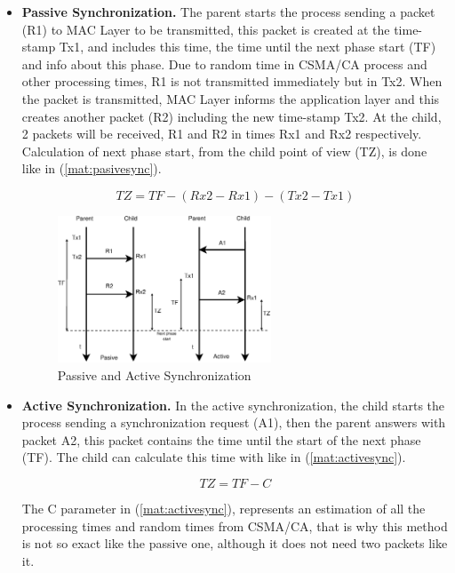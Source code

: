 \begin{itemize}
 \item \textbf{Passive Synchronization.} The parent starts the process sending a packet (R1) to \ac{MAC} Layer to be transmitted, this packet is
created at the time-stamp Tx1, and includes this time, the time until the next phase start (TF) and info about this phase. Due to random time in 
\ac{CSMA/CA} process and other processing times, R1 is not transmitted immediately but in Tx2. When the packet is transmitted, \ac{MAC} Layer informs
the application layer and this creates another packet (R2) including the new time-stamp Tx2. At the child, 2 packets will be received, R1 and 
R2 in times Rx1 and Rx2 respectively. Calculation of next phase start, from the child point of view (TZ), is done like in (\ref{mat:pasivesync}).

\begin{equation}
  TZ = TF - (Rx2 - Rx1) - (Tx2 - Tx1)
  \label{mat:pasivesync}
\end{equation}

\begin{figure}[ht]
 \begin{center}
  \includegraphics[width=0.6\textwidth]{synchronization.eps}
 \end{center}
 \caption{Passive and Active Synchronization \cite{LPLandOLP}}
 \label{fig:synchronization}
\end{figure}
 
 \item \textbf{Active Synchronization.} In the active synchronization, the child starts the process sending a synchronization request (A1),
then the parent answers with packet A2, this packet contains the time until the start of the next phase (TF). The child can calculate this time
with like in (\ref{mat:activesync}).

\begin{equation}
  TZ = TF - C
 \label{mat:activesync}
\end{equation}

The C parameter in (\ref{mat:activesync}), represents an estimation of all the processing times and random times from \ac{CSMA/CA}, that is why
this method is not so exact like the passive one, although it does not need two packets like it.
\end{itemize}

